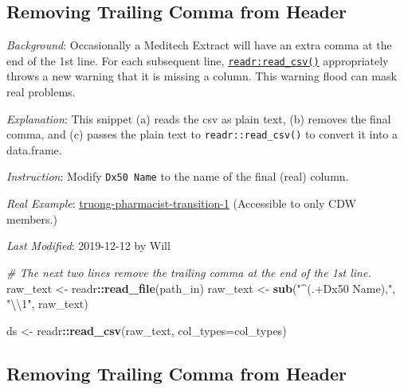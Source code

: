 \documentclass[
]{book}
\newenvironment{Shaded}{\begin{snugshade}}{\end{snugshade}}
\newcommand{\CharTok}[1]{\textcolor[rgb]{0.31,0.60,0.02}{#1}}
\newcommand{\CommentTok}[1]{\textcolor[rgb]{0.56,0.35,0.01}{\textit{#1}}}
\newcommand{\DataTypeTok}[1]{\textcolor[rgb]{0.13,0.29,0.53}{#1}}
\newcommand{\KeywordTok}[1]{\textcolor[rgb]{0.13,0.29,0.53}{\textbf{#1}}}
\newcommand{\NormalTok}[1]{#1}
\newcommand{\OperatorTok}[1]{\textcolor[rgb]{0.81,0.36,0.00}{\textbf{#1}}}
\newcommand{\StringTok}[1]{\textcolor[rgb]{0.31,0.60,0.02}{#1}}
\begin{document}
\hypertarget{snippets-reading-trailing-comma}{%
\subsection{Removing Trailing Comma from Header}\label{snippets-reading-trailing-comma}}

\emph{Background}: Occasionally a Meditech Extract will have an extra comma at the end of the 1st line. For each subsequent line, \href{https://readr.tidyverse.org/reference/read_delim.html}{\texttt{readr:read\_csv()}} appropriately throws a new warning that it is missing a column. This warning flood can mask real problems.

\emph{Explanation}: This snippet (a) reads the csv as plain text, (b) removes the final comma, and (c) passes the plain text to \texttt{readr::read\_csv()} to convert it into a data.frame.

\emph{Instruction}: Modify \texttt{Dx50\ Name} to the name of the final (real) column.

\emph{Real Example}: \href{https://github.com/OuhscBbmc/truong-pharmacist-transition-1/blob/eec6d7eb8aaa9e3df52dafb826dbc53aaf515c63/manipulation/ellis/dx-ellis.R\#L158-L162}{truong-pharmacist-transition-1} (Accessible to only CDW members.)

\emph{Last Modified}: 2019-12-12 by Will

\begin{Shaded}
\begin{Highlighting}[]
\CommentTok{\# The next two lines remove the trailing comma at the end of the 1st line.}
\NormalTok{raw\_text  \textless{}{-}}\StringTok{ }\NormalTok{readr}\OperatorTok{::}\KeywordTok{read\_file}\NormalTok{(path\_in)}
\NormalTok{raw\_text  \textless{}{-}}\StringTok{ }\KeywordTok{sub}\NormalTok{(}\StringTok{"\^{}(.+Dx50 Name),"}\NormalTok{, }\StringTok{"}\CharTok{\textbackslash{}\textbackslash{}}\StringTok{1"}\NormalTok{, raw\_text)}

\NormalTok{ds        \textless{}{-}}\StringTok{ }\NormalTok{readr}\OperatorTok{::}\KeywordTok{read\_csv}\NormalTok{(raw\_text, }\DataTypeTok{col\_types=}\NormalTok{col\_types)}
\end{Highlighting}
\end{Shaded}

\hypertarget{snippets-reading-vroom}{%
\subsection{Removing Trailing Comma from Header}\label{snippets-reading-vroom}}
\end{document}
